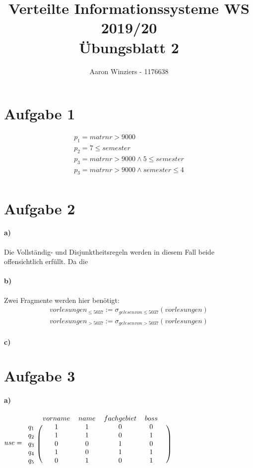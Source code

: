 \documentclass[11pt,a4paper,parskip=half ]{scrartcl}
\author{Aaron Winziers - 1176638}
\title{Verteilte Informationssysteme WS 2019/20\\\LARGE{Übungsblatt 2}}
\begin{document}
	\maketitle
\section*{Aufgabe 1}
	\begin{gather*}
		p_{1} = matrnr > 9000	\\
		p_{2} = 7\leq semester	\\
		p_{3} = matrnr > 9000 \wedge 5\leq semester	\\
		p_{3} = matrnr > 9000 \wedge semester\leq 4	\\
	\end{gather*}

\section*{Aufgabe 2}
	\paragraph{a)} Die Vollständig- und Disjunktheitsregeln werden in diesem Fall beide offensichtlich erfüllt. Da die 
	
	\paragraph{b)} Zwei Fragmente werden hier benötigt: 
	\begin{gather*}
		vorlesungen_{\leq5037} := \sigma_{gelesenvon\leq5037}(vorlesungen)	\\
		vorlesungen_{>5037} := \sigma_{gelesenvon>5037}(vorlesungen)
	\end{gather*}
	
	\paragraph{c)}

\section*{Aufgabe 3}
	\paragraph{a)}
	$ use =
	\begin{blockarray}{cccccc}
		 & vorname & name & fachgebiet & boss &  \\
		\begin{block}{c(ccccc)}
			q_{1} & 1 & 1 & 0 & 0 \\
			q_{2} & 1 & 1 & 0 & 1 \\
			q_{3} & 0 & 0 & 1 & 0 \\
			q_{4} & 1 & 0 & 1 & 1 \\
			q_{5} & 0 & 1 & 0 & 1 \\
		\end{block}
	\end{blockarray}
	$
\end{document}
